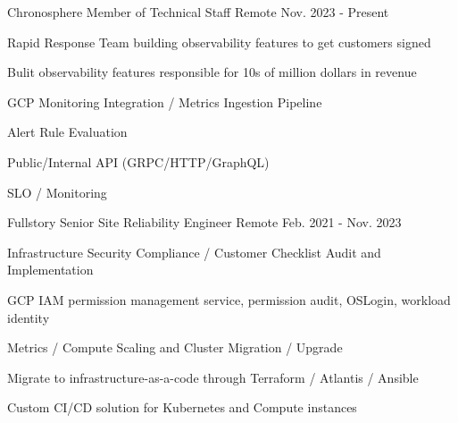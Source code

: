 

\begin{cventries}
\cventry
{Chronosphere} %
{Member of Technical Staff} %
{Remote} %
{Nov. 2023 - Present} %
{
  \begin{cvitems} %
    \item {Rapid Response Team building observability features to get customers signed}
    \item {Bulit observability features responsible for 10s of million dollars in revenue}
    \item {GCP Monitoring Integration / Metrics Ingestion Pipeline}
    \item {Alert Rule Evaluation}
    \item {Public/Internal API (GRPC/HTTP/GraphQL)}
    \item {SLO / Monitoring}
  \end{cvitems}
}

\cventry
{Fullstory} %
{Senior Site Reliability Engineer} %
{Remote} %
{Feb. 2021 - Nov. 2023} %
{
  \begin{cvitems} %
    \item {Infrastructure Security Compliance / Customer Checklist Audit and Implementation}
    \item {GCP IAM permission management service, permission audit, OSLogin, workload identity}
    \item {Metrics / Compute Scaling and Cluster Migration / Upgrade}
    \item {Migrate to infrastructure-as-a-code through Terraform / Atlantis / Ansible}
    \item {Custom CI/CD solution for Kubernetes and Compute instances}
  \end{cvitems}
}


\end{cventries}
